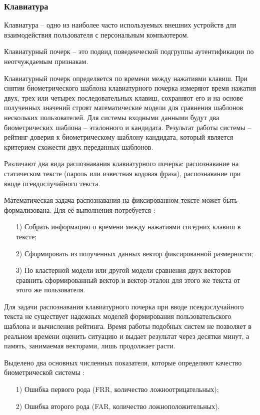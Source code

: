 \subsubsection{Клавиатура}
Клавиатура -- одно из наиболее часто используемых внешних устройств для взаимодействия пользователя с персональным компьютером.

Клавиатурный почерк -- это подвид поведенческой подгруппы аутентификации по неотчуждаемым признакам. \cite{keystroke}

Клавиатурный почерк определяется по времени между нажатиями клавиш. При снятии биометрического шаблона клавиатурного почерка измеряют время нажатия двух, трех или четырех последовательных клавиш, сохраняют его и на основе полученных значений строят математические модели для сравнения шаблонов нескольких пользователей. \cite{intrusionDetection} Для системы входными данными будут два биометрических шаблона -- эталонного и кандидата. Результат работы системы -- рейтинг доверия к биометрическому шаблону кандидата, который является критерием схожести двух переданных шаблонов.

Различают два вида распознавания клавиатурного почерка: распознавание на статическом тексте (пароль или известная кодовая фраза), распознавание при вводе псевдослучайного текста. \cite{keystroke}

Математическая задача распознавания на фиксированном тексте может быть формализована. Для её выполнения потребуется \cite{keystroke}:
\begin{itemize}
\item[1)] Собрать информацию о времени между нажатиями соседних клавиш в тексте;
\item[2)] Сформировать из полученных данных вектор фиксированной размерности;
\item[3)] По кластерной модели или другой модели сравнения двух векторов сравнить сформированный вектор и вектор-эталон для этого же текста от этого же пользователя.
\end{itemize}

Для задачи распознавания клавиатурного почерка при вводе псевдослучайного текста не существует надежных моделей формирования пользовательского шаблона и вычисления рейтинга. Время работы подобных систем не позволяет в реальном времени оценить ситуацию и выдает результат через десятки минут, а память, занимаемая векторами, лишь продолжает расти. \cite{keystroke}

Выделено два основных численных показателя, которые определяют качество биометрической системы \cite{keystroke}:
\begin{itemize}[leftmargin=1.6\parindent]
\item[1)] Ошибка первого рода (FRR, количество ложноотрицательных);
\item[2)] Ошибка второго рода (FAR, количество ложноположительных).
\end{itemize}

